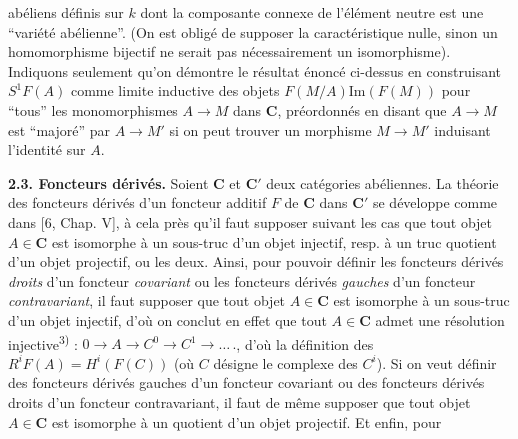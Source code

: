 
\noindent abéliens définis sur $k$ dont la composante connexe de l'élément
neutre est une ``variété abélienne''. (On est obligé de supposer la
caractéristique nulle, sinon un homomorphisme bijectif ne serait pas
nécessairement un isomorphisme). Indiquons seulement qu'on démontre le
résultat énoncé ci-dessus en construisant $S^1F(A)$ comme limite inductive des
objets $F(M/A)\mathrm{Im}(F(M))$ pour ``tous'' les monomorphismes
$A\to M$ dans $\mathbf{C}$, préordonnés en disant que
$A\to M$ est ``majoré'' par $A\to M'$ si on peut
trouver un morphisme $M\to M'$ induisant l'identité sur $A$.

\indent\textbf{2.3. Foncteurs dérivés.} Soient $\mathbf{C}$ et $\mathbf{C}'$ deux catégories
abéliennes. La théorie des foncteurs dérivés d'un foncteur additif $F$ de $\mathbf{C}$
dans $\mathbf{C}'$ se développe comme dans [6, Chap. V], à cela près qu'il faut supposer
suivant les cas que tout objet $A\in \mathbf{C}$ est isomorphe à un sous-truc d'un objet
injectif, resp. à un truc quotient d'un objet projectif, ou les deux.
Ainsi, pour pouvoir définir les foncteurs dérivés \textit{droits} d'un foncteur
\textit{covariant} ou les foncteurs dérivés \textit{gauches} d'un foncteur
\textit{contravariant}, il faut supposer que tout objet $A\in \mathbf{C}$ est isomorphe
à un sous-truc d'un objet injectif, d'où on conclut en effet que tout $A\in \mathbf{C}$
admet une résolution injective\textsuperscript{3)} :
$0\to A\to C^0\to C^1\to
\ldots\,.$, d'où la définition des
$R^iF(A)=H^i(F(C))$ (où $C$ désigne le complexe des $C^i$). Si on veut définir
des foncteurs dérivés gauches d'un foncteur covariant ou des foncteurs dérivés
droits d'un foncteur contravariant, il faut de même supposer que tout objet
$A\in \mathbf{C}$ est isomorphe à un quotient d'un objet projectif. Et enfin, pour
